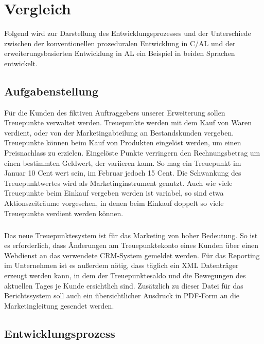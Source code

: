 \chapter{Vergleich}
\label{cha:Vergleich}

Folgend wird zur Darstellung des Entwicklungsprozesses und der Unterschiede zwischen der konventionellen prozeduralen Entwicklung in C/AL und der erweiterungsbasierten Entwicklung in AL ein Beispiel in beiden Sprachen entwickelt.


\section{Aufgabenstellung}
\label{sec:Aufgabenstellung}

Für die Kunden des fiktiven Auftraggebers unserer Erweiterung sollen Treuepunkte verwaltet werden. Treuepunkte werden mit dem Kauf von Waren verdient, oder von der Marketingabteilung an Bestandskunden vergeben. Treuepunkte können beim Kauf von Produkten eingelöst werden, um einen Preisnachlass zu erzielen. Eingelöste Punkte verringern den Rechnungsbetrag um einen bestimmten Geldwert, der variieren kann. So mag ein Treuepunkt im Januar 10 Cent wert sein, im Februar jedoch 15 Cent. Die Schwankung des Treuepunktwertes wird als Marketinginstrument genutzt. Auch wie viele Treuepunkte beim Einkauf vergeben werden ist variabel, so sind etwa Aktionszeiträume vorgesehen, in denen beim Einkauf doppelt so viele Treuepunkte verdient werden können.

\paragraph{}
Das neue Treuepunktesystem ist für das Marketing von hoher Bedeutung. So ist es erforderlich, dass Änderungen am Treuepunktekonto eines Kunden über einen Webdienst an das verwendete CRM-System gemeldet werden. Für das Reporting im Unternehmen ist es außerdem nötig, dass täglich ein XML Datenträger erzeugt werden kann, in dem der Treuepunktesaldo und die Bewegungen des aktuellen Tages je Kunde ersichtlich sind. Zusätzlich zu dieser Datei für das Berichtssystem soll auch ein übersichtlicher Ausdruck in PDF-Form an die Marketingleitung gesendet werden.
\pagebreak

\section{Entwicklungsprozess}
\label{sec:Entwicklungsprozess}

